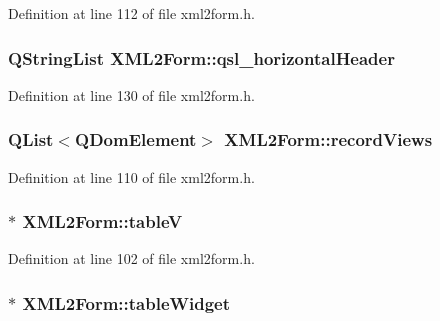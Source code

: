Definition at line 112 of file xml2form.h.

\hypertarget{classXML2Form_adaf365aa28cc5d86386e0dbc0da773c2}{
\subsubsection[{qsl\_\-horizontalHeader}]{\setlength{\rightskip}{0pt plus 5cm}QStringList {\bf XML2Form::qsl\_\-horizontalHeader}}}
\label{classXML2Form_adaf365aa28cc5d86386e0dbc0da773c2}


Definition at line 130 of file xml2form.h.

\hypertarget{classXML2Form_a9111b53f6b6c4f5c1433eb018b1a5434}{
\subsubsection[{recordViews}]{\setlength{\rightskip}{0pt plus 5cm}QList$<$QDomElement$>$ {\bf XML2Form::recordViews}}}
\label{classXML2Form_a9111b53f6b6c4f5c1433eb018b1a5434}


Definition at line 110 of file xml2form.h.

\hypertarget{classXML2Form_a765978f88c9ea144f7488fffa3f011f3}{
\subsubsection[{tableV}]{$\ast$ {\bf XML2Form::tableV}}}
\label{classXML2Form_a765978f88c9ea144f7488fffa3f011f3}


Definition at line 102 of file xml2form.h.

\hypertarget{classXML2Form_a3e475b021d282927ffd56f28c6836477}{
\subsubsection[{tableWidget}]{$\ast$ {\bf XML2Form::tableWidget}}}
\label{classXML2Form_a3e475b021d282927ffd56f28c6836477}


